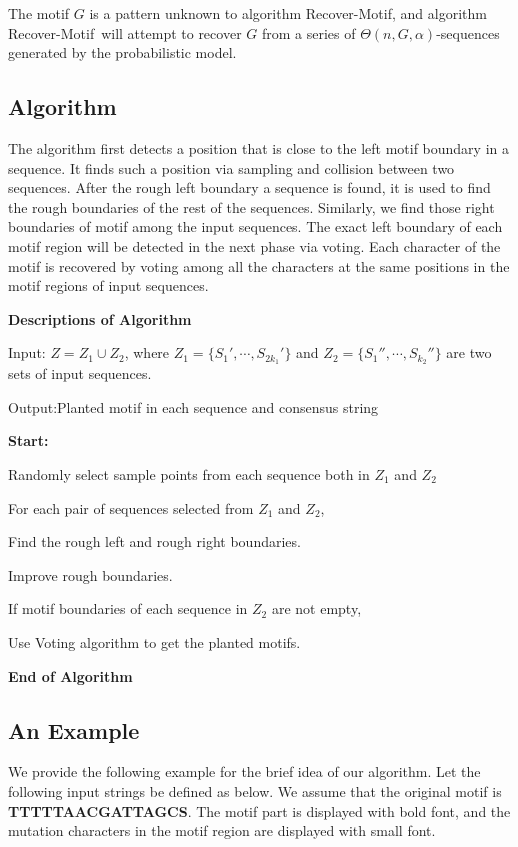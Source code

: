 \documentclass[11pt]{article}
\newcommand{\algmnam}{Recover-Motif}
\begin{document}
The motif $G$ is a pattern unknown to algorithm \algmnam, and
algorithm \algmnam~will attempt to recover $G$ from a series of
$\Theta(n,G,\alpha)$-sequences generated by the probabilistic model.



\subsection{Algorithm}

The algorithm first detects a position that is close to the left
motif boundary in a sequence. It finds such a position via sampling
and collision between two sequences. After the rough left boundary a
sequence is found, it is used to find the rough boundaries of the
rest of the sequences. Similarly, we find those right boundaries of
motif among the input sequences. The exact left boundary of each
motif region will be detected in the next phase via voting. Each
character of the motif is recovered by voting among all the
characters at the same positions in the motif regions of input
sequences.

{\bf Descriptions of Algorithm}

Input: $Z=Z_1\cup Z_2$, where $Z_1=\{S_1',\cdots, S_{2k_1}'\}$ and
$Z_2=\{S_1'',\cdots, S_{k_2}''\}$ are two sets of input sequences.

Output:Planted motif in each sequence and consensus string

{\bf Start:}

Randomly select sample points from each sequence both in $Z_1$ and $ Z_2$

For each pair of sequences selected from $Z_1$ and $ Z_2$,

\qquad  Find the rough left and rough right boundaries.

\qquad  Improve rough boundaries.

If motif boundaries of each sequence in $Z_2$ are not empty,

\qquad  Use Voting algorithm to get the planted motifs.

{\bf End of Algorithm}



 \subsection{An Example}


We provide the following example for the brief idea of our
algorithm. Let the following input strings be defined as below. We
assume that the original motif is {\bf TTTTTAACGATTAGCS}. The motif
part is displayed with bold font, and the mutation characters in the
motif region are displayed with small font.
\end{document}
